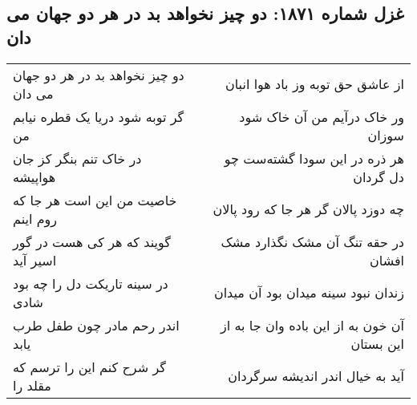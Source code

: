 \begin{center}
\section*{غزل شماره ۱۸۷۱: دو چیز نخواهد بد در هر دو جهان می دان}
\label{sec:1871}
\begin{longtable}{l p{0.5cm} r}
دو چیز نخواهد بد در هر دو جهان می دان
&&
از عاشق حق توبه وز باد هوا انبان
\\
گر توبه شود دریا یک قطره نیابم من
&&
ور خاک درآیم من آن خاک شود سوزان
\\
در خاک تنم بنگر کز جان هواپیشه
&&
هر ذره در این سودا گشته‌ست چو دل گردان
\\
خاصیت من این است هر جا که روم اینم
&&
چه دوزد پالان گر هر جا که رود پالان
\\
گویند که هر کی هست در گور اسیر آید
&&
در حقه تنگ آن مشک نگذارد مشک افشان
\\
در سینه تاریکت دل را چه بود شادی
&&
زندان نبود سینه میدان بود آن میدان
\\
اندر رحم مادر چون طفل طرب یابد
&&
آن خون به از این باده وان جا به از این بستان
\\
گر شرح کنم این را ترسم که مقلد را
&&
آید به خیال اندر اندیشه سرگردان
\\
\end{longtable}
\end{center}
